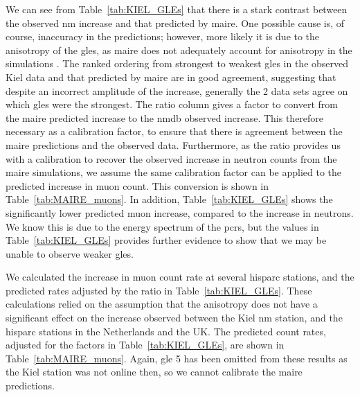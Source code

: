 We can see from Table~\ref{tab:KIEL_GLEs} that there is a stark contrast between the observed \gls{nm} increase and that predicted by \gls{maire}. One possible cause is, of course, inaccuracy in the predictions; however, more likely it is due to the anisotropy of the \glspl{gle}, as \gls{maire} does not adequately account for anisotropy in the simulations \citep{dyer_calculations_2003, lei_atmospheric_2004}. The ranked ordering from strongest to weakest \glspl{gle} in the observed Kiel data and that predicted by \gls{maire} are in good agreement, suggesting that despite an incorrect amplitude of the increase, generally the 2 data sets agree on which \glspl{gle} were the strongest. The ratio column gives a factor to convert from the \gls{maire} predicted increase to the \gls{nmdb} observed increase. This therefore necessary as a calibration factor, to ensure that there is agreement between the \gls{maire} predictions and the observed data. Furthermore, as the ratio provides us with a calibration to recover the observed increase in neutron counts from the \gls{maire} simulations, we assume the same calibration factor can be applied to the predicted increase in muon count. This conversion is shown in Table~\ref{tab:MAIRE_muons}. In addition, Table~\ref{tab:KIEL_GLEs} shows the significantly lower predicted muon increase, compared to the increase in neutrons. We know this is due to the energy spectrum of the \glspl{pcr}, but the values in Table~\ref{tab:KIEL_GLEs} provides further evidence to show that we may be unable to observe weaker \glspl{gle}.

We calculated the increase in muon count rate at several \gls{hisparc} stations, and the predicted rates adjusted by the ratio in Table~\ref{tab:KIEL_GLEs}. These calculations relied on the assumption that the anisotropy does not have a significant effect on the increase observed between the Kiel \gls{nm} station, and the \gls{hisparc} stations in the Netherlands and the UK. The predicted count rates, adjusted for the factors in Table~\ref{tab:KIEL_GLEs}, are shown in Table~\ref{tab:MAIRE_muons}. Again, \gls{gle} 5 has been omitted from these results as the Kiel station was not online then, so we cannot calibrate the \gls{maire} predictions.


